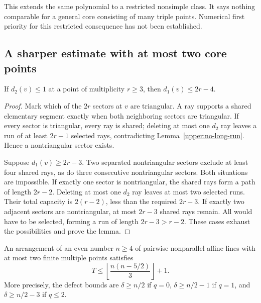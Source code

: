 This extends the same polynomial to a restricted nonsimple class. It says nothing comparable for a general core consisting of many triple points. Numerical first priority for this restricted consequence has not been established.

\subsection{A sharper estimate with at most two core points}

\begin{lemma}
\label{upper:one-core-ray}
If $d_2(v)\le1$ at a point of multiplicity $r\ge3$, then $d_1(v)\le2r-4$.
\end{lemma}

\begin{proof}
Mark which of the $2r$ sectors at $v$ are triangular. A ray supports a shared elementary segment exactly when both neighboring sectors are triangular. If every sector is triangular, every ray is shared; deleting at most one $d_2$ ray leaves a run of at least $2r-1$ selected rays, contradicting Lemma~\ref{upper:no-long-run}. Hence a nontriangular sector exists.

Suppose $d_1(v)\ge2r-3$. Two separated nontriangular sectors exclude at least four shared rays, as do three consecutive nontriangular sectors. Both situations are impossible. If exactly one sector is nontriangular, the shared rays form a path of length $2r-2$. Deleting at most one $d_2$ ray leaves at most two selected runs. Their total capacity is $2(r-2)$, less than the required $2r-3$. If exactly two adjacent sectors are nontriangular, at most $2r-3$ shared rays remain. All would have to be selected, forming a run of length $2r-3>r-2$. These cases exhaust the possibilities and prove the lemma.
\end{proof}

\begin{theorem}
\label{upper:two-core}
An arrangement of an even number $n\ge4$ of pairwise nonparallel affine lines with at most two finite multiple points satisfies
\begin{equation}
 T\le\left\lfloor\frac{n(n-5/2)}3\right\rfloor+1.
 \label{upper:two-core-upper}
\end{equation}
More precisely, the defect bounds are $\delta\ge n/2$ if $q=0$, $\delta\ge n/2-1$ if $q=1$, and $\delta\ge n/2-3$ if $q\le2$.
\end{theorem}

